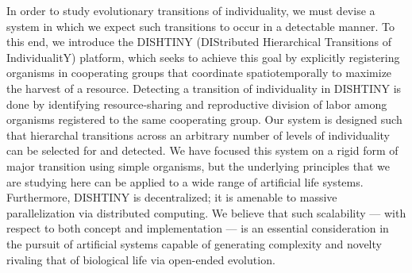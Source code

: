 In order to study evolutionary transitions of individuality, we must devise a system in which we expect such transitions to occur in a detectable manner.
To this end, we introduce the DISHTINY (DIStributed Hierarchical Transitions of IndividualitY) platform, which seeks to achieve this goal by explicitly registering organisms in cooperating groups that coordinate spatiotemporally to maximize the harvest of a resource.
Detecting a transition of individuality in DISHTINY %
is done by identifying
resource-sharing and reproductive division of labor among organisms registered to the same cooperating group.
Our system is designed such that hierarchal transitions across an arbitrary number of levels of individuality can be selected for and detected.  We have focused this system on a rigid form of major transition using simple organisms, but the underlying principles that we are studying here can be applied to a wide range of artificial life systems.
Furthermore, DISHTINY is decentralized; it is amenable to massive parallelization via distributed computing.
We believe that such scalability --- with respect to both concept and implementation --- is an essential consideration in the pursuit of artificial systems capable of generating complexity and novelty rivaling that of biological life via open-ended evolution.

